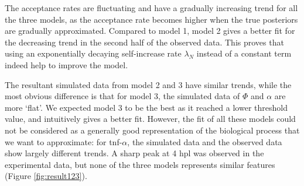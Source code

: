 The acceptance rates are fluctuating and have a gradually increasing trend for all the three models, as the acceptance rate becomes higher when the true posteriors are gradually approximated. Compared to model 1, model 2 gives a better fit for the decreasing trend in the second half of the observed data. This proves that using an exponentially decaying self-increase rate $\lambda_N$ instead of a constant term indeed help to improve the model.

The resultant simulated data from model 2 and 3 have similar trends, while the most obvious difference is that for model 3, the simulated data of $\Phi$ and $\alpha$ are more `flat'. We expected model 3 to be the best as it reached a lower threshold value, and intuitively gives a better fit. However, the fit of all these models could not be considered as a generally good representation of the biological process that we want to approximate: for tnf-$\alpha$, the simulated data and the observed data show largely different trends. A sharp peak at 4 hpl was observed in the experimental data, but none of the three models represents similar features (Figure \ref{fig:result123}).

